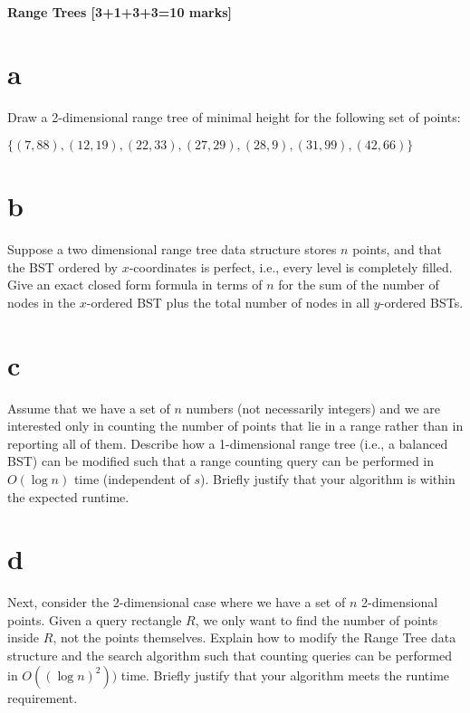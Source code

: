 \documentclass[12pt]{article}
\begin{document}
	\subsection{Range Trees [3+1+3+3=10 marks]}
	
	\begin{itemize}
		\part{a} Draw a 2-dimensional range tree of minimal height for the following set of points:
		\begin{center}
			$\{(7, 88), (12, 19), (22, 33), (27, 29), (28, 9), (31, 99), (42, 66)\}$ 
		\end{center}
		
		\part{b} Suppose a two dimensional range tree data structure stores $n$ points, and that the BST ordered by $x$-coordinates is perfect, i.e., every level is completely filled.
		Give an exact closed form formula in terms of $n$ for the sum of the number of nodes in the $x$-ordered BST plus the total number of nodes in all $y$-ordered BSTs.
		
		\part{c} Assume that we have a set of $n$ numbers (not necessarily integers) and we are interested only in counting the number of points that lie in a range rather than in reporting all of them.
		Describe how a 1-dimensional range tree (i.e., a balanced BST) can be modified such that a range counting query can be performed in $O(\log n)$ time (independent of $s$).  
		Briefly justify that your algorithm is within the expected runtime.
		
		\part{d} Next, consider the 2-dimensional case where we have a set of $n$ 2-dimensional points.
		Given a query rectangle $R$, we only want to find the number of points inside $R$, not the points themselves.
		Explain how to modify the Range Tree data structure and the search algorithm such that counting queries can be performed in $O((\log n)^2))$ time.  
		Briefly justify that your algorithm meets the runtime requirement.
		
	\end{itemize}
	
\end{document}
